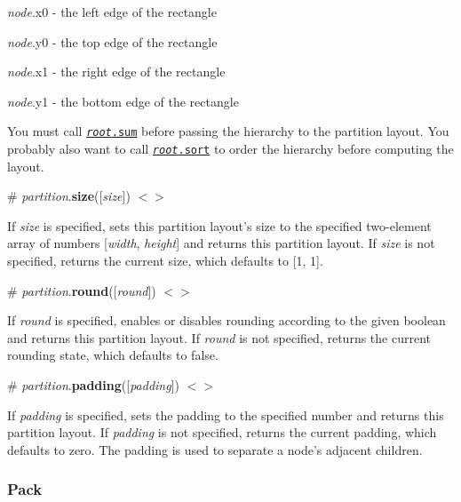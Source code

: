 \begin{DoxyItemize}
\item {\itshape node}.x0 -\/ the left edge of the rectangle
\item {\itshape node}.y0 -\/ the top edge of the rectangle
\item {\itshape node}.x1 -\/ the right edge of the rectangle
\item {\itshape node}.y1 -\/ the bottom edge of the rectangle
\end{DoxyItemize}

You must call \href{#node_sum}{\tt {\itshape root}.sum} before passing the hierarchy to the partition layout. You probably also want to call \href{#node_sort}{\tt {\itshape root}.sort} to order the hierarchy before computing the layout.

\label{_partition_size}%
\# {\itshape partition}.{\bfseries size}(\mbox{[}{\itshape size}\mbox{]}) \href{https://github.com/d3/d3-hierarchy/blob/master/src/partition.js#L43}{\tt $<$$>$}

If {\itshape size} is specified, sets this partition layout’s size to the specified two-\/element array of numbers \mbox{[}{\itshape width}, {\itshape height}\mbox{]} and returns this partition layout. If {\itshape size} is not specified, returns the current size, which defaults to \mbox{[}1, 1\mbox{]}.

\label{_partition_round}%
\# {\itshape partition}.{\bfseries round}(\mbox{[}{\itshape round}\mbox{]}) \href{https://github.com/d3/d3-hierarchy/blob/master/src/partition.js#L39}{\tt $<$$>$}

If {\itshape round} is specified, enables or disables rounding according to the given boolean and returns this partition layout. If {\itshape round} is not specified, returns the current rounding state, which defaults to false.

\label{_partition_padding}%
\# {\itshape partition}.{\bfseries padding}(\mbox{[}{\itshape padding}\mbox{]}) \href{https://github.com/d3/d3-hierarchy/blob/master/src/partition.js#L47}{\tt $<$$>$}

If {\itshape padding} is specified, sets the padding to the specified number and returns this partition layout. If {\itshape padding} is not specified, returns the current padding, which defaults to zero. The padding is used to separate a node’s adjacent children.

\subsubsection*{Pack}

